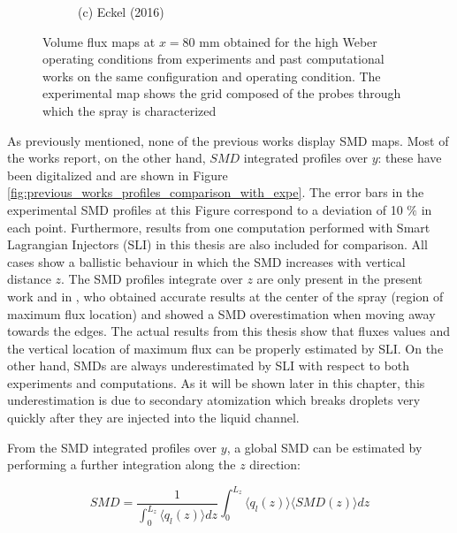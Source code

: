 \begin{figure}[h!]
\begin{subfigure}[b]{0.2\textwidth}
   \caption*{(c) Eckel (2016)}
\end{subfigure}
\caption{Volume flux maps at $x = 80$ mm obtained for the high Weber operating conditions from experiments  and past computational works on the same configuration and operating condition. The experimental map shows the grid composed of the probes through which the spray is characterized}
\label{fig:maps_previous_numerical_results}
\end{figure}

As previously mentioned, none of the previous works display SMD maps. Most of the works report, on the other hand, $SMD$ integrated profiles over $y$: these have been digitalized and are shown in Figure \ref{fig:previous_works_profiles_comparison_with_expe}.   The error bars in the experimental SMD profiles at this Figure correspond to a deviation of 10 $\%$ in each point. Furthermore, results from one computation performed with Smart Lagrangian Injectors (SLI) in this thesis are also included for comparison. All cases show a ballistic behaviour in which the SMD increases with vertical distance $z$. The SMD profiles integrate over $z$ are only present in the present work and in , who obtained accurate results at the center of the spray (region of maximum flux location) and showed a SMD overestimation when moving away towards the edges. The actual results from this thesis show that fluxes values  and the vertical location of maximum flux can be properly estimated by SLI. On the other hand, SMDs are always underestimated by SLI with respect to both experiments and computations. As it will be shown later in this chapter, this underestimation is due to secondary atomization which breaks droplets very quickly after they are injected into the liquid channel.

From the SMD integrated profiles over $y$, a global SMD can be estimated by performing a further integration along the $z$ direction:

\begin{equation}
 SMD =  \frac{1}{ \int_0^{L_z} \langle q_l \left( z \right) \rangle dz} \int_0^{L_z} \langle q_l \left( z \right) \rangle \langle SMD \left( z \right) \rangle dz
\end{equation}



